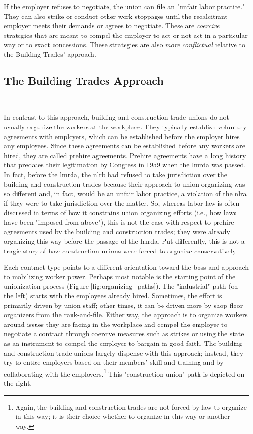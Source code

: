 \documentclass[12pt]{article}
\begin{document}
If the employer refuses to negotiate, the union can file an "unfair labor practice." They can also strike or conduct other work stoppages until the recalcitrant employer meets their demands or agrees to negotiate. These are \textit{coercive} strategies that are meant to compel the employer to act or not act in a particular way or to exact concessions. These strategies are also \textit{more conflictual} relative to the Building Trades' approach.

\subsection{The Building Trades Approach}\label{sub:bt_bargaining}\

In contrast to this approach, building and construction trade unions do not usually organize the workers at the workplace. They typically establish voluntary agreements with employers, which can be established before the employer hires any employees. Since these agreements can be established before any workers are hired, they are called prehire agreements. Prehire agreements have a long history that predates their legitimation by Congress in 1959 when the \acrfull{lmrda} was passed. In fact, before the \acrshort{lmrda}, the \acrshort{nlrb} had refused to take jurisdiction over the building and construction trades because their approach to union organizing was so different and, in fact, would be an unfair labor practice, a violation of the \acrshort{nlra} if they were to take jurisdiction over the matter. So, whereas labor law is often discussed in terms of how it constrains union organizing efforts (i.e., how laws have been "imposed from above"), this is not the case with respect to prehire agreements used by the building and construction trades; they were already organizing this way before the passage of the \acrshort{lmrda}. Put differently, this is not a tragic story of how construction unions were forced to organize conservatively.

Each contract type points to a different orientation toward the boss and approach to mobilizing worker power. Perhaps most notable is the starting point of the unionization process (Figure \ref{fig:organizing_paths}). The "industrial" path (on the left) starts with the employees already hired. Sometimes, the effort is primarily driven by union staff; other times, it can be driven more by shop floor organizers from the rank-and-file. Either way, the approach is to organize workers around issues they are facing in the workplace and compel the employer to negotiate a contract through coercive measures such as strikes or using the state as an instrument to compel the employer to bargain in good faith. The building and construction trade unions largely dispense with this approach; instead, they try to entice employers based on their members’ skill and training and by collaborating with the employers.\footnote{Again, the building and construction trades are not forced by law to organize in this way; it is their choice whether to organize in this way or another way.} This "construction union" path is depicted on the right.
\end{document}
